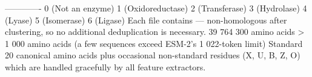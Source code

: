 {}\markdownRendererPipe{}------\markdownRendererPipe{}-------\markdownRendererPipe{}\markdownRendererSoftLineBreak
{}\markdownRendererPipe{}  \markdownRendererPipe{} 0 (Not an enzyme) \markdownRendererPipe{}\markdownRendererSoftLineBreak
{}\markdownRendererPipe{}  \markdownRendererPipe{} 1 (Oxidoreductase) \markdownRendererPipe{}\markdownRendererSoftLineBreak
{}\markdownRendererPipe{}  \markdownRendererPipe{} 2 (Transferase) \markdownRendererPipe{}\markdownRendererSoftLineBreak
{}\markdownRendererPipe{}  \markdownRendererPipe{} 3 (Hydrolase) \markdownRendererPipe{}\markdownRendererSoftLineBreak
{}\markdownRendererPipe{}  \markdownRendererPipe{} 4 (Lyase) \markdownRendererPipe{}\markdownRendererSoftLineBreak
{}\markdownRendererPipe{}  \markdownRendererPipe{} 5 (Isomerase) \markdownRendererPipe{}\markdownRendererSoftLineBreak
{}\markdownRendererPipe{}  \markdownRendererPipe{} 6 (Ligase) \markdownRendererPipe{}\markdownRendererParagraphSeparator
{}Each file contains  — non-homologous after clustering, so no\markdownRendererSoftLineBreak
{}additional deduplication is necessary.\markdownRendererInterblockSeparator
{}\markdownRendererSectionBegin
{}\markdownRendererInterblockSeparator
{}\markdownRendererUlBeginTight
\markdownRendererUlItem {} 39 764\markdownRendererUlItemEnd 
\markdownRendererUlItem {} \markdownRendererTilde{}300 amino acids\markdownRendererUlItemEnd 
\markdownRendererUlItem {} > 1 000 amino acids (a few sequences exceed ESM-2's 1 022-token limit)\markdownRendererUlItemEnd 
\markdownRendererUlItem {} Standard 20 canonical amino acids plus occasional non-standard residues (X, U, B, Z, O) which are handled gracefully by all feature extractors.\markdownRendererUlItemEnd 
